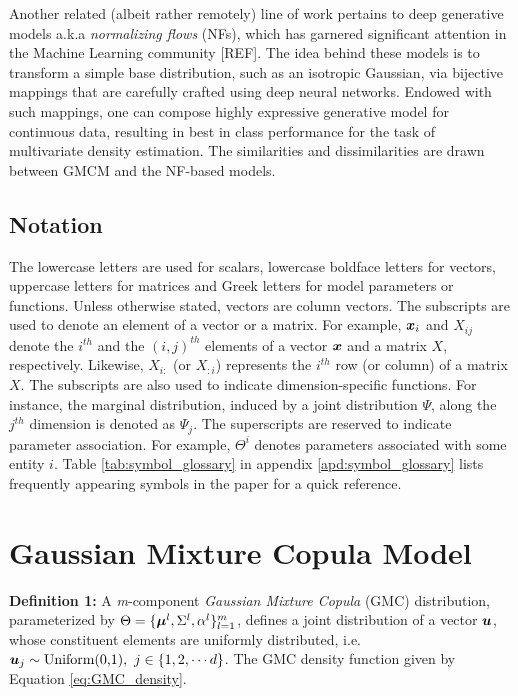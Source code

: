 \documentclass{article}
\theoremstyle{plain}
\theoremstyle{definition}
\theoremstyle{remark}
\begin{document}
Another related (albeit rather remotely) line of work pertains to deep generative models a.k.a \emph{normalizing flows} (NFs), which has garnered significant attention in  the Machine Learning community [REF]. The idea behind these models is to transform a simple base distribution, such as an isotropic Gaussian, via bijective mappings that are carefully crafted using deep neural networks. Endowed with such mappings, one can compose highly expressive generative model for continuous data, resulting in best in class performance for the task of multivariate density estimation. The similarities and dissimilarities are drawn between GMCM and the NF-based models.   

\subsection{Notation}\label{subsec:Notation}
The lowercase letters are used for scalars, lowercase boldface letters for vectors, uppercase letters for matrices and Greek letters for model parameters or functions. Unless otherwise stated, vectors are column vectors. The subscripts are used to denote an element of a vector or a matrix. For example, $\boldsymbol{x}_i$ and $X_{ij}$ denote the $i^{th}$ and the $(i,j)^{th}$ elements of a vector $\boldsymbol{x}$ and a matrix $X$, respectively. Likewise, $X_{i:}$ (or $X_{:i}$) represents the $i^{th}$ row (or column) of a matrix $X$. The subscripts are also used to indicate dimension-specific functions. For instance, the marginal distribution, induced by a joint distribution $\Psi$, along the $j^{th}$ dimension is denoted as $\Psi_j$.  The superscripts are reserved to indicate parameter association. For example, $\Theta^i$ denotes parameters associated with some entity $i$. Table \ref{tab:symbol_glossary} in appendix \ref{apd:symbol_glossary} lists frequently appearing symbols in the paper for a quick reference.

\section{Gaussian Mixture Copula Model}\label{sec:GMC_description}
\textbf{Definition 1:}  A \emph{m}-component \emph{Gaussian Mixture Copula} (GMC) distribution, parameterized by $\Theta = \{\boldsymbol{\mu}^l, \Sigma^l, \alpha^l\}_{l=1}^m$, defines a joint distribution of a vector $\boldsymbol{u}$, whose constituent elements are uniformly distributed, i.e. $ \boldsymbol{u}_j \sim \text{Uniform(0,1)}, \  j\in \{1,2,\cdots d\}$. The GMC density function given by Equation \eqref{eq:GMC_density}.
\end{document}
